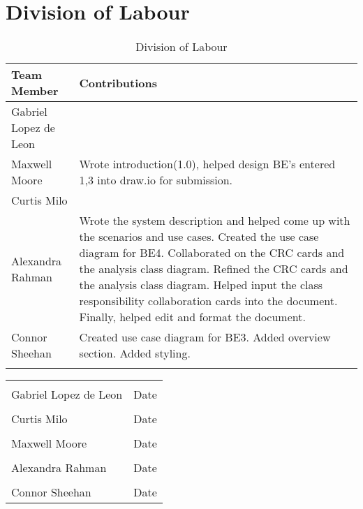 \documentclass[titlepage]{article}
\begin{document}
\newpage

\appendix
\section{Division of Labour}
\label{sec:division_of_labour}
\begin{longtable}{| p{} | p{} |}
			\hline
			\textbf {Team Member} & \textbf{Contributions}\\ 
			\hline
			Gabriel Lopez de Leon &  %
			\\
			\hline
			Maxwell Moore & Wrote introduction(1.0), helped design BE's entered 1,3 into draw.io for submission.
			\\
			\hline
			Curtis Milo & %
			\\ 
			\hline
			Alexandra Rahman & Wrote the system description and helped come up with the scenarios and use cases. Created the use case diagram for BE4. Collaborated on the CRC cards and the analysis class diagram. Refined the CRC cards and the analysis class diagram. Helped input the class responsibility collaboration cards into the document. Finally, helped edit and format the document.
			\\
			\hline
			Connor Sheehan & Created use case diagram for BE3. Added overview section. Added styling.\\
			\hline
			
			\caption{Division of Labour}
		\end{longtable}



\noindent\begin{tabular}{ll}\\
	\makebox[2.5in]{\hrulefill} & \makebox[2.5in]			{\hrulefill}\\
	Gabriel Lopez de Leon & Date\\[8ex]%
	\makebox[2.5in]{\hrulefill} & \makebox[2.5in]			{\hrulefill}\\
	Curtis Milo & Date\\[8ex]
	\makebox[2.5in]{\hrulefill} & \makebox[2.5in]			{\hrulefill}\\
	Maxwell Moore & Date\\[8ex]
	\makebox[2.5in]{\hrulefill} & \makebox[2.5in]			{\hrulefill}\\
	Alexandra Rahman & Date\\[8ex]
	\makebox[2.5in]{\hrulefill} & \makebox[2.5in]			{\hrulefill}\\
	Connor Sheehan & Date\\
	\end{tabular}
\end{document}
